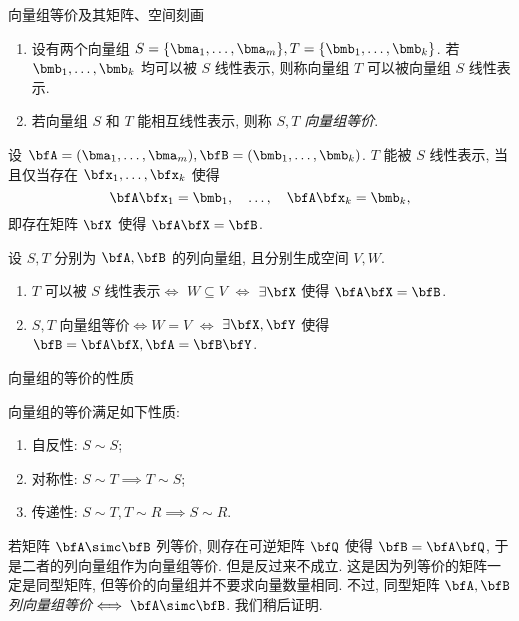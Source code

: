 \begin{frame}{向量组等价及其矩阵、空间刻画}
	\onslide<+->
	\begin{definition}
		\begin{enumerate}
			\item 设有两个向量组 $S=\{\bma_1,\dots,\bma_m\}, T=\{\bmb_1,\dots,\bmb_k\}$.
			若 $\bmb_1,\dots,\bmb_k$ 均可以被 $S$ 线性表示, 则称向量组 $T$ 可以被向量组 $S$ 线性表示.
			\item 若向量组 $S$ 和 $T$ 能相互线性表示, 则称 $S,T$ \emph{向量组等价}.
		\end{enumerate}
	\end{definition}
	\onslide<+->
	设 $\bfA=(\bma_1,\dots,\bma_m),\bfB=(\bmb_1,\dots,\bmb_k)$.
	\onslide<+->
	$T$ 能被 $S$ 线性表示, 当且仅当存在 $\bfx_1,\dots,\bfx_k$ 使得
	\[\bfA\bfx_1=\bmb_1,\quad\dots,\quad\bfA\bfx_k=\bmb_k,\]
	\onslide<+->
	即存在矩阵 $\bfX$ 使得 $\bfA\bfX=\bfB$.
	\onslide<+->
	\begin{theorem}
		设 $S,T$ 分别为 $\bfA,\bfB$ 的列向量组, 且分别生成空间 $V,W$.
		\begin{enumerate}
			\item $T$ 可以被 $S$ 线性表示$\iff$ $W\subseteq V$
			$\iff$ $\exists\bfX$ 使得 $\bfA\bfX=\bfB$.
			\item $S,T$ 向量组等价$\iff W=V$ $\iff$ $\exists\bfX,\bfY$ 使得 $\bfB=\bfA\bfX,\bfA=\bfB\bfY$.
		\end{enumerate}
	\end{theorem}
\end{frame}


\begin{frame}{向量组的等价的性质}
	\onslide<+->
	\begin{proposition}
		向量组的等价满足如下性质:
		\begin{enumerate}
			\item 自反性: $S\sim S$;
			\item 对称性: $S\sim T\implies T\sim S$;
			\item 传递性: $S\sim T,T\sim R\implies S\sim R$.
		\end{enumerate}
	\end{proposition}
	
	\onslide<+->
	若矩阵 $\bfA\simc\bfB$ 列等价, 则存在可逆矩阵 $\bfQ$ 使得 $\bfB=\bfA\bfQ$,
	\onslide<+->
	于是二者的列向量组作为向量组等价.
	\onslide<+->
	但是反过来\alert{不成立}.
	\onslide<+->
	这是因为列等价的矩阵一定是同型矩阵, 但等价的向量组并不要求向量数量相同.
	\onslide<+->
	不过, 同型矩阵 \emph{$\bfA,\bfB$ 列向量组等价$\iff \bfA\simc\bfB$}.
	\onslide<+->
	我们稍后证明.
\end{frame}


